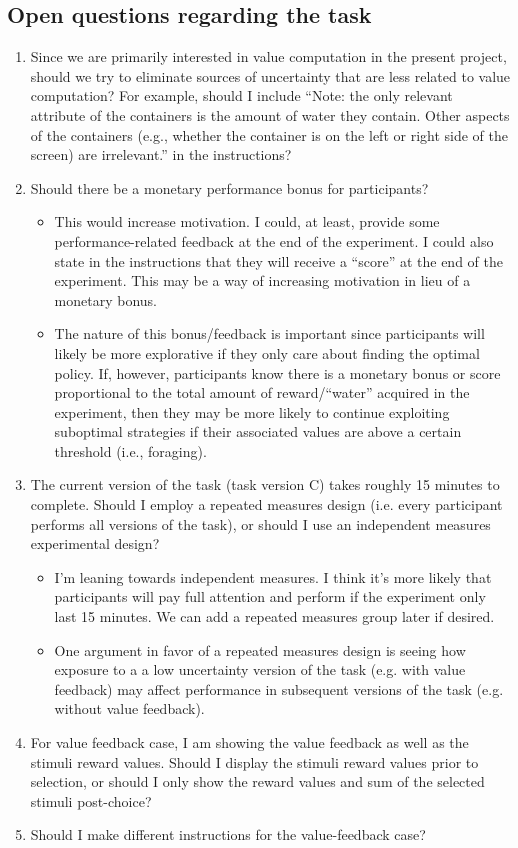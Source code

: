 \documentclass[11pt]{article}
\begin{document}
\subsection{Open questions regarding the task}
\label{sec:org96576c3}
\begin{enumerate}
\item Since we are primarily interested in value computation in the present project, should we try to eliminate sources of uncertainty that are less related to value computation? For example, should I include ``Note: the only relevant attribute of the containers is the amount of water they contain. Other aspects of the containers (e.g., whether the container is on the left or right side of the screen) are irrelevant.'' in the instructions?
\item Should there be a monetary performance bonus for participants?
\begin{itemize}
\item This would increase motivation. I could, at least, provide some performance-related feedback at the end of the experiment. I could also state in the instructions that they will receive a ``score'' at the end of the experiment. This may be a way of increasing motivation in lieu of a monetary bonus.
\item The nature of this bonus/feedback is important since participants will likely be more explorative if they only care about finding the optimal policy. If, however, participants know there is a monetary bonus or score proportional to the total amount of reward/``water'' acquired in the experiment, then they may be more likely to continue exploiting suboptimal strategies if their associated values are above a certain threshold (i.e., foraging).
\end{itemize}
\item The current version of the task (task version C) takes roughly 15 minutes to complete. Should I employ a repeated measures design (i.e. every participant performs all versions of the task), or should I use an independent measures experimental design?
\begin{itemize}
\item I'm leaning towards independent measures. I think it's more likely that participants will pay full attention and perform if the experiment only last 15 minutes. We can add a repeated measures group later if desired.
\item One argument in favor of a repeated measures design is seeing how exposure to a a low uncertainty version of the task (e.g. with value feedback) may affect performance in subsequent versions of the task (e.g. without value feedback).
\end{itemize}
\item For value feedback case, I am showing the value feedback as well as the stimuli reward values. Should I display the stimuli reward values prior to selection, or should I only show the reward values and sum of the selected stimuli post-choice?
\item Should I make different instructions for the value-feedback case?
\end{enumerate}
\end{document}
